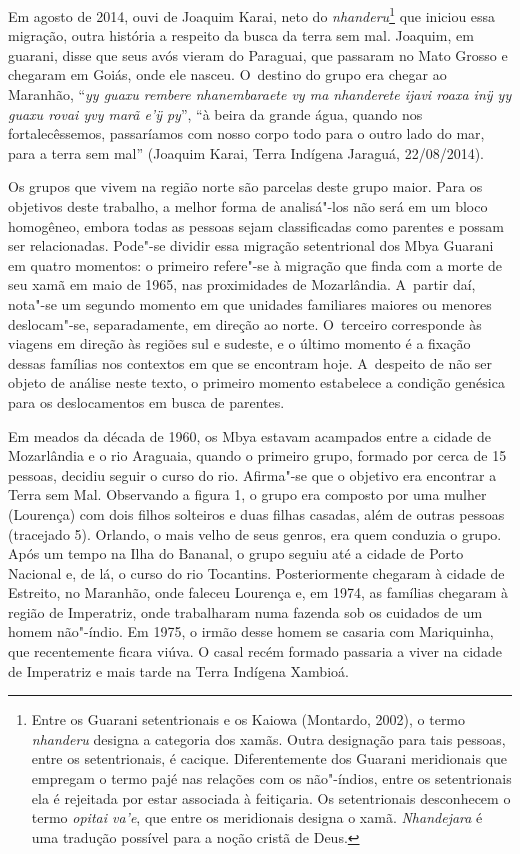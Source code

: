 Em agosto de 2014, ouvi de Joaquim Karai, neto do
\emph{nhanderu}\footnote{Entre os Guarani setentrionais e os Kaiowa (Montardo,
2002), o termo \emph{nhanderu} designa a categoria dos xamãs. Outra designação
para tais pessoas, entre os setentrionais, é cacique. Diferentemente
dos Guarani meridionais que empregam o termo pajé nas relações com os
não"-índios, entre os setentrionais ela é rejeitada por estar associada à
feitiçaria. Os setentrionais desconhecem o termo \emph{opitai va’e}, que entre
os meridionais designa o xamã. \emph{Nhandejara} é uma tradução possível para
a noção cristã de Deus.} que iniciou essa migração, outra história a
respeito da busca da terra sem mal. Joaquim, em guarani, disse que seus
avós vieram do Paraguai, que passaram no Mato Grosso e chegaram em
Goiás, onde ele nasceu. O~destino do grupo era chegar ao Maranhão, ``\emph{yy
guaxu rembere nhanembaraete vy ma nhanderete ijavi roaxa inÿ yy guaxu
rovai yvy marã e’ÿ py}'', ``à beira da grande água, quando nos
fortalecêssemos, passaríamos com nosso corpo todo para o outro lado do
mar, para a terra sem mal'' (Joaquim Karai, Terra Indígena Jaraguá,
22/08/2014).

Os grupos que vivem na região norte são parcelas deste grupo maior. Para
os objetivos deste trabalho, a melhor forma de analisá"-los não será em
um bloco homogêneo, embora todas as pessoas sejam classificadas como
parentes e possam ser relacionadas. Pode"-se dividir essa migração
setentrional dos Mbya Guarani em quatro momentos: o primeiro refere"-se
à migração que finda com a morte de seu xamã em maio de 1965, nas
proximidades de Mozarlândia. A~partir daí, nota"-se um segundo momento
em que unidades familiares maiores ou menores deslocam"-se,
separadamente, em direção ao norte. O~terceiro corresponde às viagens
em direção às regiões sul e sudeste, e o último momento é a fixação
dessas famílias nos contextos em que se encontram hoje. A~despeito de
não ser objeto de análise neste texto, o primeiro momento estabelece a
condição genésica para os deslocamentos em busca de parentes.

Em meados da década de 1960, os Mbya estavam acampados 
entre a cidade de Mozarlândia e o rio Araguaia, quando o primeiro
grupo, formado por cerca de 15 pessoas, decidiu seguir o curso do rio.
Afirma"-se que o objetivo era encontrar a Terra sem Mal. Observando a
figura 1, o grupo era composto por uma mulher (Lourença) com dois
filhos solteiros e duas filhas casadas, além de outras pessoas
(tracejado 5). Orlando, o mais velho de seus genros, era quem conduzia
o grupo. Após um tempo na Ilha do Bananal, o grupo seguiu até a cidade
de Porto Nacional e, de lá, o curso do rio Tocantins. Posteriormente
chegaram à cidade de Estreito, no Maranhão, onde faleceu Lourença e, em
1974, as famílias chegaram à região de Imperatriz, onde trabalharam
numa fazenda sob os cuidados de um homem não"-índio. Em 1975, o irmão
desse homem se casaria com Mariquinha, que recentemente ficara viúva. O
casal recém formado passaria a viver na cidade de Imperatriz e mais
tarde na Terra Indígena Xambioá. 

